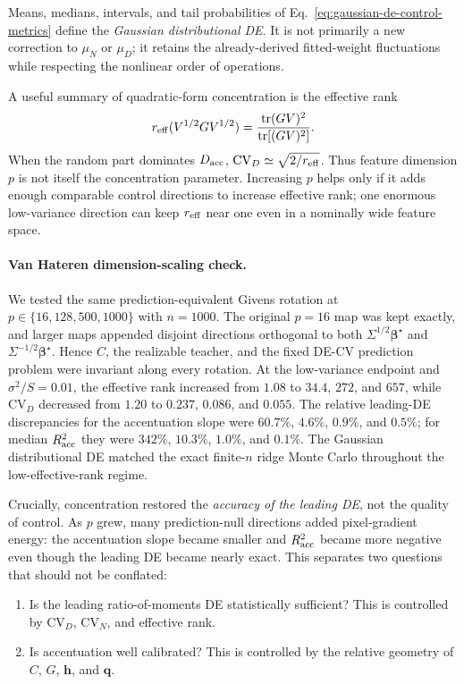\documentclass[11pt]{article}
\newcommand{\tr}{\operatorname{tr}}
\newcommand{\bstar}{\bm\beta^{\star}}
\begin{document}
Means, medians, intervals, and tail probabilities of
Eq.~\eqref{eq:gaussian-de-control-metrics} define the \emph{Gaussian
distributional DE}.  It is not primarily a new correction to $\mu_N$ or
$\mu_D$; it retains the already-derived fitted-weight fluctuations while
respecting the nonlinear order of operations.

A useful summary of quadratic-form concentration is the effective rank
\begin{equation}
  r_{\rm eff}(V^{1/2}GV^{1/2})
  =\frac{\tr(GV)^2}{\tr[(GV)^2]}.
  \label{eq:control-effective-rank}
\end{equation}
When the random part dominates $D_{\rm acc}$,
$\mathrm{CV}_D\simeq\sqrt{2/r_{\rm eff}}$.  Thus feature dimension $p$ is
not itself the concentration parameter.  Increasing $p$ helps only if it adds
enough comparable control directions to increase effective rank; one enormous
low-variance direction can keep $r_{\rm eff}$ near one even in a nominally
wide feature space.

\paragraph{Van Hateren dimension-scaling check.}
We tested the same prediction-equivalent Givens rotation at
$p\in\{16,128,500,1000\}$ with $n=1000$.  The original $p=16$ map was kept
exactly, and larger maps appended disjoint directions orthogonal to both
$\Sigma^{1/2}\bstar$ and $\Sigma^{-1/2}\bstar$.  Hence $C$, the realizable
teacher, and the fixed DE-CV prediction problem were invariant along every
rotation.  At the low-variance endpoint and $\sigma^2/S=0.01$, the effective
rank increased from $1.08$ to $34.4$, $272$, and $657$, while
$\mathrm{CV}_D$ decreased from $1.20$ to $0.237$, $0.086$, and $0.055$.
The relative leading-DE discrepancies for the accentuation slope were
$60.7\%$, $4.6\%$, $0.9\%$, and $0.5\%$; for median
$R^2_{\rm acc}$ they were $342\%$, $10.3\%$, $1.0\%$, and $0.1\%$.
The Gaussian distributional DE matched the exact finite-$n$ ridge Monte Carlo
throughout the low-effective-rank regime.

Crucially, concentration restored the \emph{accuracy of the leading DE}, not
the quality of control.  As $p$ grew, many prediction-null directions added
pixel-gradient energy: the accentuation slope became smaller and
$R^2_{\rm acc}$ became more negative even though the leading DE became nearly
exact.  This separates two questions that should not be conflated:
\begin{enumerate}
  \item Is the leading ratio-of-moments DE statistically sufficient?  This is
        controlled by $\mathrm{CV}_D$, $\mathrm{CV}_N$, and effective rank.
  \item Is accentuation well calibrated?  This is controlled by the relative
        geometry of $C$, $G$, $\bm h$, and $\bm q$.
\end{enumerate}
\end{document}
